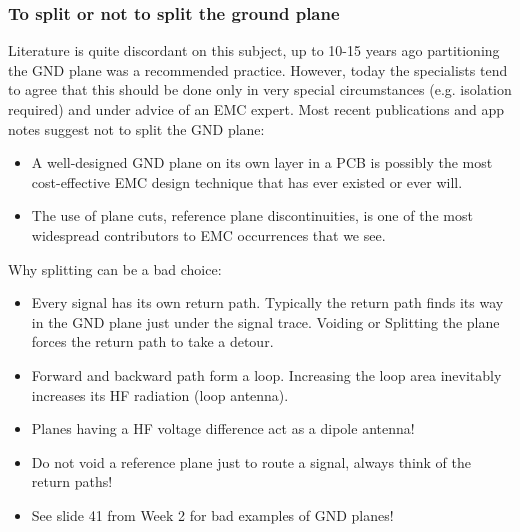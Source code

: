 		\subsubsection{To split or not to split the ground plane}
		Literature is quite discordant on this subject, up to 10-15 years ago partitioning the GND plane was a recommended practice. However, today the specialists tend to agree that this should be done only in very special circumstances (e.g. isolation required) and under advice of an EMC expert. 		
		Most recent publications and app notes suggest not to split the GND plane:
		\begin{itemize}
			\item A well-designed GND plane on its own layer in a PCB is possibly the most cost-effective EMC design technique that has ever existed or ever will. 
			\item The use of plane cuts, reference plane discontinuities, is one of the most widespread contributors to EMC occurrences that we see. 
		\end{itemize}
		Why splitting can be a bad choice: 
		\begin{itemize}
			\item Every signal has its own return path. Typically the return path finds its way in the GND plane just under the signal trace. Voiding or Splitting the plane forces the return path to take a detour. 
			\item Forward and backward path form a loop. Increasing the loop area inevitably increases its HF radiation (loop antenna).
			\item Planes having a HF voltage difference act as a dipole antenna! 
			\item Do not void a reference plane just to route a signal, always think of the return paths!
			\item See slide 41 from Week 2 for bad examples of GND planes!
		\end{itemize}

